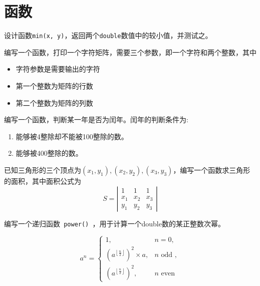 \section{函数}

\begin{frame}
  \begin{biancheng}
    设计函数\lstinline|min(x, y)|，返回两个\lstinline|double|数值中的较小值，并测试之。
  \end{biancheng}
\end{frame}

\begin{frame}
  \begin{biancheng}
    编写一个函数，打印一个字符矩阵，需要三个参数，即一个字符和两个整数，其中
    \begin{itemize}
    \item 字符参数是需要输出的字符
    \item 第一个整数为矩阵的行数
    \item 第二个整数为矩阵的列数
    \end{itemize}
  \end{biancheng}
\end{frame}

\begin{frame}
  \begin{biancheng}
    编写一个函数，判断某一年是否为闰年。闰年的判断条件为:
    \begin{enumerate}
    \item 能够被4整除却不能被100整除的数。
    \item 能够被400整除的数。
    \end{enumerate}
  \end{biancheng}
\end{frame}

\begin{frame}
  \begin{biancheng}
    已知三角形的三个顶点为$(x_1,y_1), (x_2, y_2), (x_3, y_3)$，编写一个函数求三角形的面积，其中面积公式为
    $$
    S = \left|
      \begin{array}{ccc}
        1&1&1\\
        x_1&x_2&x_3\\
        y_1&y_2&y_3
      \end{array}
    \right|
    $$
  \end{biancheng}
\end{frame}

\begin{frame}
  \begin{biancheng}
    编写一个递归函数\lstinline| power() |，用于计算一个double数的某正整数次幂。
  \end{biancheng} \pause 

  $$
  a^n = \left\{
    \begin{array}{ll}
      1, & n = 0, \\[.1in]
      \left(a^{\left\lfloor \frac n2 \right\rfloor}\right)^2 \times a, & n \mbox{ odd }, \\[.1in]
      \left(a^{\left\lfloor \frac n2 \right\rfloor}\right)^2 , & n \mbox{ even }
    \end{array}
  \right.
  $$
\end{frame}

